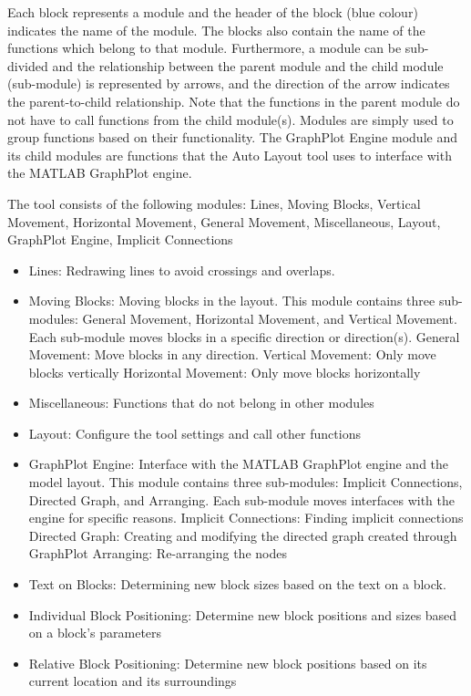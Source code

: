 \documentclass[12pt,letterpaper]{report}
\newcommand{\tool}{Auto Layout\xspace}
\begin{document}
\par Each block represents a module and the header of the block (blue colour) indicates the name of the module. The blocks also contain the name of the functions which belong to that module. Furthermore, a module can be sub-divided and the relationship between the parent module and the child module (sub-module) is represented by arrows, and the direction of the arrow indicates the parent-to-child relationship. Note that the functions in the parent module do not have to call functions from the child module(s). Modules are simply used to group functions based on their functionality. The GraphPlot Engine module and its child modules are functions that the \tool tool uses to interface with the MATLAB GraphPlot engine.
\par The tool consists of the following modules: Lines, Moving Blocks, Vertical Movement, Horizontal Movement, General Movement, Miscellaneous, Layout, GraphPlot Engine, Implicit Connections
\begin{itemize}
	\item Lines: Redrawing lines to avoid crossings and overlaps.
	\item Moving Blocks: Moving blocks in the layout. This module contains three sub-modules: General Movement, Horizontal Movement, and Vertical Movement. Each sub-module moves blocks in a specific direction or direction(s).
		\subitem General Movement: Move blocks in any direction.
		\subitem Vertical Movement: Only move blocks vertically
		\subitem Horizontal Movement: Only move blocks horizontally
	\item Miscellaneous: Functions that do not belong in other modules
	\item Layout: Configure the tool settings and call other functions
	\item GraphPlot Engine: Interface with the MATLAB GraphPlot engine and the model layout. This module contains three sub-modules: Implicit Connections, Directed Graph, and Arranging. Each sub-module moves interfaces with the engine for specific reasons.
		\subitem Implicit Connections: Finding implicit connections
		\subitem Directed Graph: Creating and modifying the directed graph created through GraphPlot
		\subitem Arranging: Re-arranging the nodes
	\item Text on Blocks: Determining new block sizes based on the text on a block.
	\item Individual Block Positioning: Determine new block positions and sizes based on a block's parameters
	\item Relative Block Positioning: Determine new block positions based on its current location and its surroundings
\end{itemize}
\end{document}
